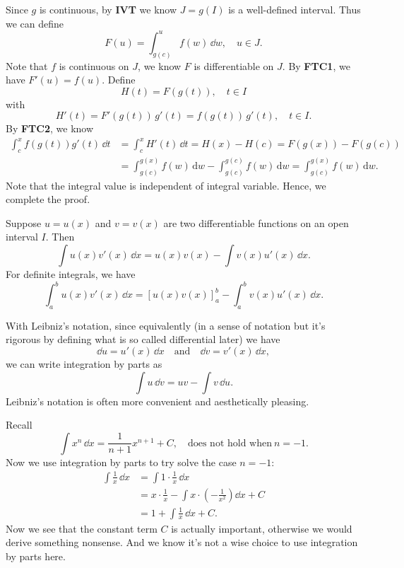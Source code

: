     \begin{proofenv}
        Since $g$ is continuous, by \textbf{IVT} we know $J=g(I)$ is a well-defined interval. Thus we can define
        \[
        F(u)=\int _{g(c)}^u f(w)\, \dd w,\quad u \in J.
        \]
        Note that $f$ is continuous on $J$, we know $F$ is differentiable on $J$. By \textbf{FTC1}, we have $F'(u)=f(u)$. Define
        \[
        H(t) = F(g(t)),\quad t\in I
        \]
        with
        \[
        H'(t)=F'(g(t))\,g'(t)=f(g(t))\,g'(t),\quad t\in I.
        \]
        By \textbf{FTC2}, we know
        \[
        \begin{aligned}
            \int_c^x f(g(t))g'(t)\,\dd t &= \int_c^x H'(t)\,\dd t = H(x)-H(c)=F(g(x))-F(g(c)) \\ &= \int_{g(c)}^{g(x)} f(w)\,\mathrm{d}w - \int_{g(c)}^{g(c)} f(w)\,\mathrm{d}w = \int_{g(c)}^{g(x)} f(w)\,\mathrm{d}w.
        \end{aligned}
        \]
        Note that the integral value is independent of integral variable. Hence, we complete the proof.
    \end{proofenv}
	\begin{methodenv}
		Suppose $u=u(x)$ and $v=v(x)$ are two differentiable functions on an open interval $I$. Then
		\[
		\int u(x) v'(x)\, \dd x = u(x) v(x) - \int v(x) u'(x)\, \dd x.
		\]
		For definite integrals, we have
		\[
		\int_a^b u(x) v'(x)\, \dd x = \left[ u(x) v(x) \right]_a^b - \int_a^b v(x) u'(x)\, \dd x.
		\]
	\end{methodenv}
	\begin{remarkenv}
		With Leibniz's notation, since equivalently (in a sense of notation but it's rigorous by defining what is so called differential later) we have
		\[
		\dd u = u'(x)\, \dd x \quad \text{and}\quad \dd v = v'(x)\, \dd x,
		\]
		we can write integration by parts as
		\[
		\int u\, \dd v = uv - \int v\, \dd u.
		\]
		Leibniz's notation is often more convenient and aesthetically pleasing.
	\end{remarkenv}
	\begin{exampleenv}
		Recall
		\[
		\int x^n\, \dd x = \frac{1}{n+1} x^{n+1} + C,\quad \text{does not hold when}\ n=-1.
		\]
		Now we use integration by parts to try solve the case $n=-1$:
		\[
		\begin{aligned}
			\int \frac{1}{x}\, \dd x &= \int 1 \cdot \frac{1}{x}\, \dd x\\[6pt]
			&= x \cdot \frac{1}{x} - \int x \cdot \left( -\frac{1}{x^2} \right) \dd x + C\\[6pt]
			&= 1 + \int \frac{1}{x}\, \dd x + C.
		\end{aligned}
		\]
		Now we see that the constant term $C$ is actually important, otherwise we would derive something nonsense. And we know it's not a wise choice to use integration by parts here. 
	\end{exampleenv}
